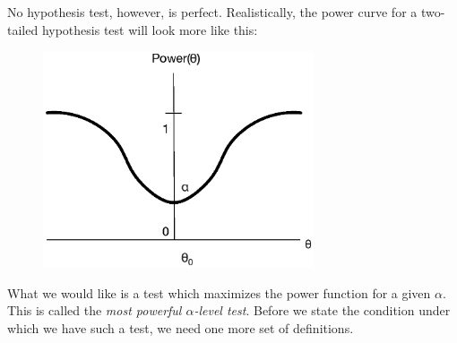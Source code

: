 \documentclass[notes.tex]{subfiles}
\begin{document}
No hypothesis test, however, is perfect. Realistically, the power curve for a two-tailed hypothesis test will look more like this:

\begin{figure}[H]
\centering
\includegraphics[width=8cm]{realpower}
\end{figure}

What we would like is a test which maximizes the power function for a given $\alpha$. This is called the \emph{most powerful $\alpha$-level test}. Before we state the condition under which we have such a test, we need one more set of definitions.
\end{document}
